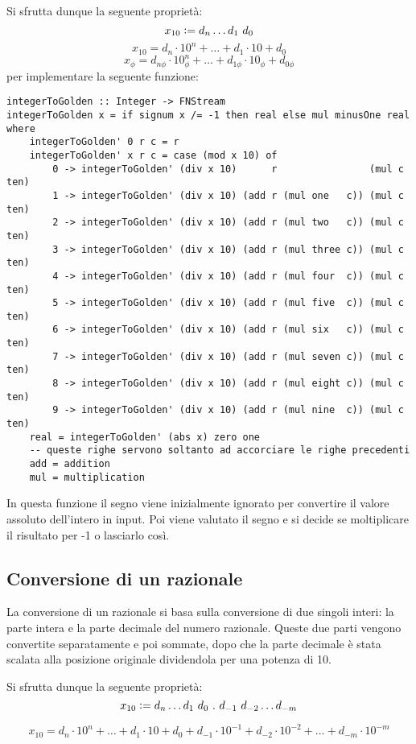 \documentclass[Lau,oneside]{sapthesis}
\begin{document}
Si sfrutta dunque la seguente proprietà:
$$x_{10} \vcentcolon = d_n \ldots d_1 \ d_0$$
$$x_{10} = d_n \cdot 10^n + \ldots + d_1 \cdot 10 + d_0$$
$$x_\phi = d_{n\phi} \cdot 10_\phi^n + \ldots + d_{1\phi} \cdot 10_\phi + d_{0\phi}$$
per implementare la seguente funzione:
\begin{verbatim}
integerToGolden :: Integer -> FNStream
integerToGolden x = if signum x /= -1 then real else mul minusOne real where
    integerToGolden' 0 r c = r
    integerToGolden' x r c = case (mod x 10) of
        0 -> integerToGolden' (div x 10)      r                (mul c ten)
        1 -> integerToGolden' (div x 10) (add r (mul one   c)) (mul c ten)
        2 -> integerToGolden' (div x 10) (add r (mul two   c)) (mul c ten)
        3 -> integerToGolden' (div x 10) (add r (mul three c)) (mul c ten)
        4 -> integerToGolden' (div x 10) (add r (mul four  c)) (mul c ten)
        5 -> integerToGolden' (div x 10) (add r (mul five  c)) (mul c ten)
        6 -> integerToGolden' (div x 10) (add r (mul six   c)) (mul c ten)
        7 -> integerToGolden' (div x 10) (add r (mul seven c)) (mul c ten)
        8 -> integerToGolden' (div x 10) (add r (mul eight c)) (mul c ten)
        9 -> integerToGolden' (div x 10) (add r (mul nine  c)) (mul c ten)
    real = integerToGolden' (abs x) zero one
    -- queste righe servono soltanto ad accorciare le righe precedenti
    add = addition
    mul = multiplication
\end{verbatim}
In questa funzione il segno viene inizialmente ignorato per convertire il valore assoluto dell'intero in input. Poi viene valutato il segno e si decide se moltiplicare il risultato per -1 o lasciarlo così.


\subsection{Conversione di un razionale}
La conversione di un razionale si basa sulla conversione di due singoli interi: la parte intera e la parte decimale del numero razionale. Queste due parti vengono convertite separatamente e poi sommate, dopo che la parte decimale è stata scalata alla posizione originale dividendola per una potenza di 10.

Si sfrutta dunque la seguente proprietà:
$$x_{10} \vcentcolon = d_n \ldots d_1 \ d_0 \ . \ d_{-1} \ d_{-2} \ldots d_{-m}$$

$$x_{10} = d_n \cdot 10^n + \ldots + d_1 \cdot 10 + d_0 + d_{-1} \cdot 10^{-1} + d_{-2} \cdot 10^{-2} + \ldots + d_{-m} \cdot 10^{-m}$$
\end{document}
